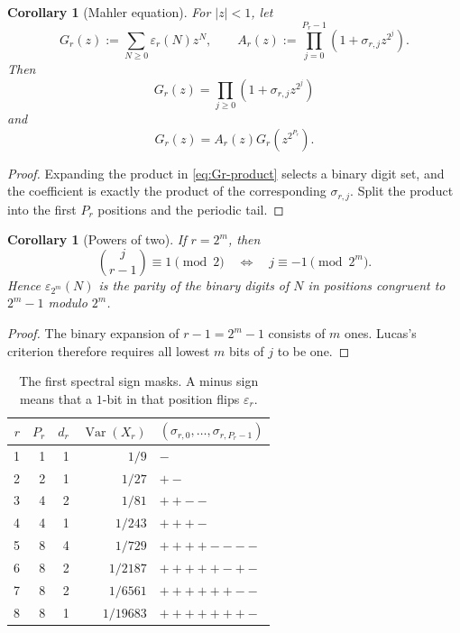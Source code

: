 \documentclass[11pt,a4paper]{article}
\theoremstyle{frontier}
\newtheorem{corollary}[theorem]{Corollary}
\theoremstyle{definition}
\newcommand{\Var}{\operatorname{Var}}
\begin{document}
\begin{corollary}[Mahler equation]\label{cor:mahler-r}
For $|z|<1$, let
\begin{equation}\label{eq:Gr}
 G_r(z):=\sum_{N\ge0}\varepsilon_r(N)z^N,
 \qquad
 A_r(z):=\prod_{j=0}^{P_r-1}(1+\sigma_{r,j}z^{2^j}).
\end{equation}
Then
\begin{equation}\label{eq:Gr-product}
 G_r(z)=\prod_{j\ge0}(1+\sigma_{r,j}z^{2^j})
\end{equation}
and
\begin{equation}\label{eq:mahler-r}
  G_r(z)=A_r(z)G_r\!\left(z^{2^{P_r}}\right).
\end{equation}
\end{corollary}

\begin{proof}
Expanding the product in \eqref{eq:Gr-product} selects a binary digit set, and the coefficient is exactly the product of the corresponding $\sigma_{r,j}$.  Split the product into the first $P_r$ positions and the periodic tail.
\end{proof}

\begin{corollary}[Powers of two]\label{cor:power-two-rank}
If $r=2^m$, then
\begin{equation}\label{eq:power-two-position}
 \binom j{r-1}\equiv1\pmod2
 \quad\Longleftrightarrow\quad
 j\equiv-1\pmod{2^m}.
\end{equation}
Hence $\varepsilon_{2^m}(N)$ is the parity of the binary digits of $N$ in positions congruent to $2^m-1$ modulo $2^m$.
\end{corollary}

\begin{proof}
The binary expansion of $r-1=2^m-1$ consists of $m$ ones.  Lucas's criterion therefore requires all lowest $m$ bits of $j$ to be one.
\end{proof}

\begin{table}[ht]
\centering
\caption{The first spectral sign masks.  A minus sign means that a $1$-bit in that position flips $\varepsilon_r$.}
\label{tab:sign-masks}
\begin{tabular}{@{}rrrrl@{}}
\toprule
$r$ & $P_r$ & $d_r$ & $\Var(X_r)$ & $(\sigma_{r,0},\ldots,\sigma_{r,P_r-1})$\\
\midrule
1 & 1 & 1 & $1/9$     & $-$\\
2 & 2 & 1 & $1/27$    & $+-$\\
3 & 4 & 2 & $1/81$    & $++--$\\
4 & 4 & 1 & $1/243$   & $+++- $\\
5 & 8 & 4 & $1/729$   & $++++----$\\
6 & 8 & 2 & $1/2187$  & $+++++-+-$\\
7 & 8 & 2 & $1/6561$  & $++++++--$\\
8 & 8 & 1 & $1/19683$ & $+++++++- $\\
\bottomrule
\end{tabular}
\end{table}
\end{document}
